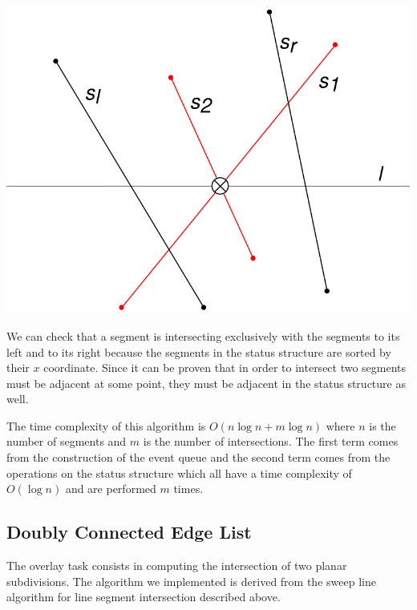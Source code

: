 \begin{enumerate}
\begin{enumerate}
\begin{minipage}{0.6\textwidth}
\begin{enumerate}
                        \end{enumerate}
                    \end{minipage}
                    \begin{minipage}{0.3\textwidth}
                        \centering
                        \includegraphics[width=\textwidth]{images/intersection.png}
                    \end{minipage}
          \end{enumerate}
\end{enumerate}

We can check that a segment is intersecting exclusively with the segments to its left and to its right because the segments in the status structure are sorted by their $x$ coordinate. Since it can be proven that in order to intersect two segments must be adjacent at some point, they must be adjacent in the status structure as well.

The time complexity of this algorithm is $O(n\log n + m \log n)$ where $n$ is the number of segments and $m$ is the number of intersections. The first term comes from the construction of the event queue and the second term comes from the operations on the status structure which all have a time complexity of $O(\log n)$ and are performed $m$ times.

\subsection{Doubly Connected Edge List}
\label{sec:dcel}
The overlay task consists in computing the intersection of two planar subdivisions. The algorithm we implemented is derived from the sweep line algorithm for line segment intersection described above.


